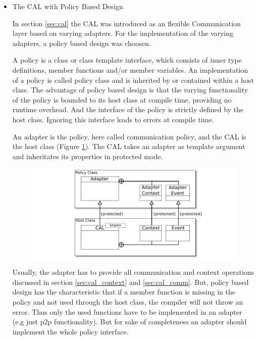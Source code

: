 \begin{itemize}

\item The CAL with Policy Based Design

  In section \ref{sec:cal} the CAL was introduced as an flexible
  Communication layer based on varying adapters. For the implementation
  of the varying adapters, a policy based design was choosen.

  A policy is a class or class template interface, which consists of
  inner type definitions, member functions and/or member variables. An
  implementation of a policy is called policy class and is inherited
  by or contained within a host class.
  The advantage of policy based design is that the varying
  functionality of the policy is bounded to its host class at compile
  time, providing no runtime overhead. And the interface of the policy
  is strictly defined by the host class. Ignoring this interface leads
  to errors at compile time.


  An adapter is the policy, here called communication policy, and the
  CAL is the host class (Figure \ref{fig:cal_uml}). The CAL takes an
  adapter as template argument and inheritates its properties in
  protected mode. 

  \begin{figure}[H]
    \centering \includegraphics[width=\textwidth]{graphics/40_cal_uml}
    \caption{  }
    \label{fig:cal_uml}
  \end{figure}

  Usually, the adapter has to provide all communication and context
  operations discussed in section \ref{sec:cal_context} and
  \ref{sec:cal_comm}. But, policy based design has the characteristic
  that if a member function is missing in the policy and not used
  through the host class, the compiler will not throw an error. Thus
  only the used functions have to be implemented in an adapter (e.g
  just p2p functionality). But for sake of completeness an adapter
  should implement the whole policy interface.


\end{itemize}
